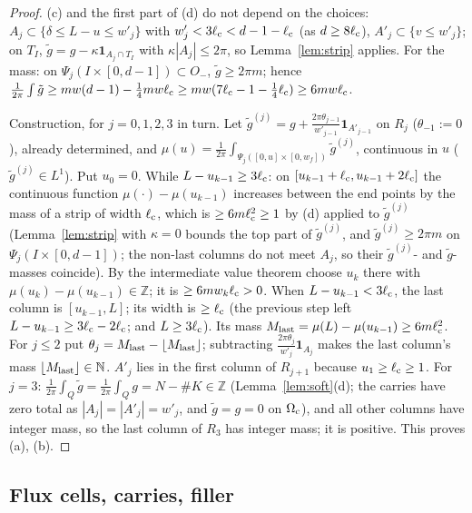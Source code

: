 \documentclass[11pt]{article}
\theoremstyle{definition}
\theoremstyle{remark}
\newcommand{\Z}{\mathbb Z}
\newcommand{\N}{\mathbb N}
\newcommand{\dep}{\delta}
\newcommand{\lc}{\ell_{\rm c}}
\begin{document}
\begin{proof}
(c) and the first part of (d) do not depend on the choices: $A_j\subset\{\dep\le L-u\le w'_j\}$ with $w'_j<3\lc<d-1-\lc$ (as $d\ge8\lc$), $A'_j\subset\{v\le w'_j\}$;
on $T_I$, $\tilde g=g-\kappa\mathbf 1_{A_j\cap T_I}$ with $\kappa|A_j|\le2\pi$, so Lemma~\ref{lem:strip} applies. For the mass: on $\Psi_j(I\times[0,d-1])\subset O_-$,
$\tilde g\ge2\pi m$; hence $\frac1{2\pi}\int\tilde g\ge mw(d-1)-\frac14mw\lc\ge mw(7\lc-1-\frac14\lc)\ge6mw\lc$.

Construction, for $j=0,1,2,3$ in turn. Let $\tilde g^{(j)}=g+\frac{2\pi\theta_{j-1}}{w'_{j-1}}\mathbf 1_{A'_{j-1}}$ on $R_j$ ($\theta_{-1}:=0$), already determined, and
$\mu(u)=\frac1{2\pi}\int_{\Psi_j([0,u]\times[0,w_f])}\tilde g^{(j)}$, continuous in $u$ ($\tilde g^{(j)}\in L^1$). Put $u_0=0$. While $L-u_{k-1}\ge3\lc$: on
$[u_{k-1}+\lc,u_{k-1}+2\lc]$ the continuous function $\mu(\cdot)-\mu(u_{k-1})$ increases between the end points by the mass of a strip of width $\lc$, which is
$\ge6m\lc^2\ge1$ by (d) applied to $\tilde g^{(j)}$ (Lemma~\ref{lem:strip} with $\kappa=0$ bounds the top part of $\tilde g^{(j)}$, and $\tilde g^{(j)}\ge2\pi m$ on $\Psi_j(I\times[0,d-1])$; the non-last columns do not meet
$A_j$, so their $\tilde g^{(j)}$- and $\tilde g$-masses coincide). By the intermediate value theorem
choose $u_k$ there with $\mu(u_k)-\mu(u_{k-1})\in\Z$; it is $\ge6mw_k\lc>0$. When $L-u_{k-1}<3\lc$, the last column is $[u_{k-1},L]$; its width is $\ge\lc$
(the previous step left $L-u_{k-1}\ge3\lc-2\lc$; and $L\ge3\lc$). Its mass $M_{\rm last}=\mu(L)-\mu(u_{k-1})\ge6m\lc^2$. For $j\le2$ put
$\theta_j=M_{\rm last}-\lfloor M_{\rm last}\rfloor$; subtracting $\frac{2\pi\theta_j}{w'_j}\mathbf 1_{A_j}$ makes the last column's mass $\lfloor M_{\rm last}\rfloor\in\N$.
$A'_j$ lies in the first column of $R_{j+1}$ because $u_1\ge\lc\ge1$. For $j=3$: $\frac1{2\pi}\int_Q\tilde g=\frac1{2\pi}\int_Qg=N-\#K\in\Z$
(Lemma~\ref{lem:soft}(d); the carries have zero total as $|A_j|=|A'_j|=w'_j$, and $\tilde g=g=0$ on $\Omega_{\rm c}$), and all other columns have integer
mass, so the last column of $R_3$ has integer mass; it is positive. This proves (a), (b).
\end{proof}

\subsection{Flux cells, carries, filler}
\end{document}
